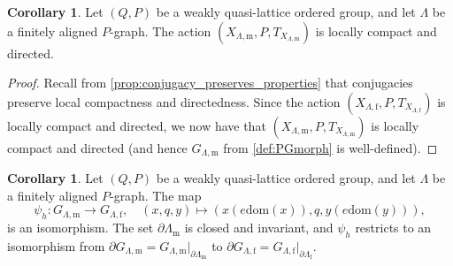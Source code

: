 \documentclass[11pt]{amsart}
\theoremstyle{definition}
\numberwithin{thm}{section}
\numberwithin{equation}{section}
\newtheorem{corollary}[thm]{Corollary}
\newcommand{\morphdom}[1]{\mathrm{dom}(#1)}
\newcommand{\M}{\mathrm{m}}
\newcommand{\F}{\mathrm{f}}
\newcommand{\PS}[2]{X_{#2, #1}}
\newcommand{\PG}[2]{{G_{#2, #1}}}
\newcommand{\BPS}[2]{\partial{#2}_{#1}}
\newcommand{\BPG}[2]{\partial\PG{#1}{#2}}
\newcommand{\reduction}[2]{#1|_{#2}}
\begin{document}
\begin{corollary}
Let $(Q, P)$ be a weakly quasi-lattice ordered group, and let $\Lambda$ be a finitely aligned $P$-graph.
The action $(\PS{\M}{\Lambda}, P, T_{\PS{\M}{\Lambda}})$ is locally compact and directed.
\end{corollary}
\begin{proof}
Recall from \cref{prop:conjugacy_preserves_properties} that conjugacies preserve local compactness and directedness.
Since the action $(\PS{\F}{\Lambda}, P, T_{\PS{\F}{\Lambda}})$ is locally compact and directed, we now have that 
$(\PS{\M}{\Lambda}, P, T_{\PS{\M}{\Lambda}})$ is locally compact and directed (and hence $\PG{\M}{\Lambda}$ from \cref{def:PGmorph} is well-defined).
\end{proof}

\begin{corollary}
\label{cor:isom}
Let $(Q, P)$ be a weakly quasi-lattice ordered group, and let $\Lambda$ be a finitely aligned $P$-graph.
The map 
\[
\psi_h \colon \PG{\M}{\Lambda} \to \PG{\F}{\Lambda}, \quad 
(x, q, y) \mapsto (x(e\morphdom{x}), q, y(e\morphdom{y})),
\]
is an isomorphism. 
The set $\BPS{\M}{\Lambda}$ is closed and invariant, and $\psi_h$ restricts to an isomorphism from $\BPG{\M}{\Lambda} = \reduction{\PG{\M}{\Lambda}}{\BPS{\M}{\Lambda}}$ to $\BPG{\F}{\Lambda} = \reduction{\PG{\F}{\Lambda}}{\BPS{\F}{\Lambda}}$.
\end{corollary}
\end{document}
